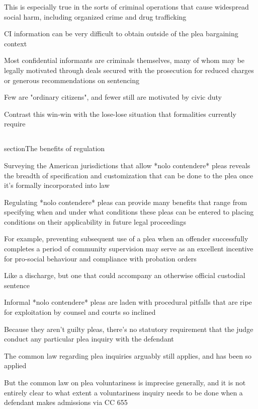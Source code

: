 This is especially true in the sorts of criminal operations that cause widespread social harm, including organized crime and drug trafficking

CI information can be very difficult to obtain outside of the plea bargaining context

Most confidential informants are criminals themselves, many of whom may be legally motivated through deals secured with the prosecution for reduced charges or generous recommendations on sentencing

Few are "ordinary citizens", and fewer still are motivated by civic duty

Contrast this win-win with the lose-lose situation that formalities currently require

\subsection{}section{The benefits of regulation}

Surveying the American jurisdictions that allow *nolo contendere* pleas reveals the breadth of specification and customization that can be done to the plea once it's formally incorporated into law

Regulating *nolo contendere* pleas can provide many benefits that range from specifying when and under what conditions these pleas can be entered to placing conditions on their applicability in future legal proceedings

For example, preventing subsequent use of a plea when an offender successfully completes a period of community supervision may serve as an excellent incentive for pro-social behaviour and compliance with probation orders

Like a discharge, but one that could accompany an otherwise official custodial sentence

Informal *nolo contendere* pleas are laden with procedural pitfalls that are ripe for exploitation by counsel and courts so inclined

Because they aren't guilty pleas, there's no statutory requirement that the judge conduct any particular plea inquiry with the defendant

The common law regarding plea inquiries arguably still applies, and has been so applied

But the common law on plea voluntariness is imprecise generally, and it is not entirely clear to what extent a voluntariness inquiry needs to be done when a defendant makes admissions via CC 655

